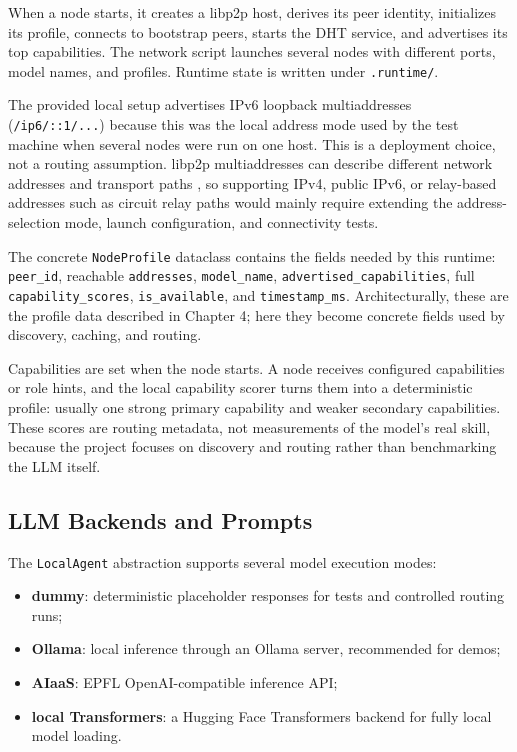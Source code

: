 When a node starts, it creates a libp2p host, derives its peer identity,
initializes its profile, connects to bootstrap peers, starts the DHT service,
and advertises its top capabilities. The network script launches several nodes
with different ports, model names, and profiles. Runtime state is written under
\texttt{.runtime/}.

The provided local setup advertises IPv6 loopback multiaddresses
(\texttt{/ip6/::1/...}) because this was the local address mode used by the
test machine when several nodes were run on one host. This is a deployment
choice, not a routing assumption. libp2p
multiaddresses can describe different network addresses and transport paths
\citep{libp2paddressing}, so supporting IPv4, public IPv6, or relay-based
addresses such as circuit relay paths \citep{libp2pcircuitrelay} would mainly
require extending the address-selection mode, launch configuration, and
connectivity tests.

The concrete \texttt{NodeProfile} dataclass contains the fields needed by this
runtime: \texttt{peer\_id}, reachable \texttt{addresses}, \texttt{model\_name},
\texttt{advertised\_capabilities}, full \texttt{capability\_scores},
\texttt{is\_available}, and \texttt{timestamp\_ms}. Architecturally, these are
the profile data described in Chapter 4; here they become concrete fields used
by discovery, caching, and routing.

Capabilities are set when the node starts. A node receives configured
capabilities or role hints, and the local capability scorer turns them into a
deterministic profile: usually one strong primary capability and weaker
secondary capabilities. These scores are routing metadata, not measurements of
the model's real skill, because the project focuses on discovery and routing
rather than benchmarking the LLM itself.

\subsection{LLM Backends and Prompts}

The \texttt{LocalAgent} abstraction supports several model execution modes:

\begin{itemize}
  \item \textbf{dummy}: deterministic placeholder responses for tests and
  controlled routing runs;
  \item \textbf{Ollama}: local inference through an Ollama server, recommended
  for demos;
  \item \textbf{AIaaS}: EPFL OpenAI-compatible inference API;
  \item \textbf{local Transformers}: a Hugging Face Transformers backend for
  fully local model loading.
\end{itemize}

